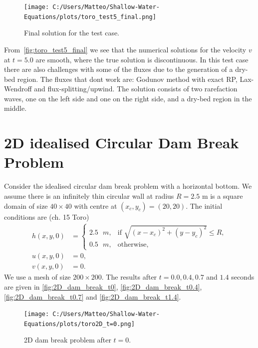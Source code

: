 \begin{figure}[H]
    \centering
    \texttt{[image: C:/Users/Matteo/Shallow-Water-Equations/plots/toro\_test5\_final.png]}
    \caption{Final solution for the test case.}\label{fig:toro_test5_final}
\end{figure}
From~\autoref{fig:toro_test5_final} we see that the numerical solutions for the velocity $v$ at $t=5.0$ are smooth, where the true solution is discontinuous. 
In this test case there are also challenges with some of the fluxes due to the generation of a dry-bed region.
The fluxes that dont work are: Godunov method with exact RP, Lax-Wendroff and flux-splitting/upwind.
The solution consists of two rarefaction waves, one on the left side and one on the right side, and a dry-bed region in the middle.

\section{2D idealised Circular Dam Break Problem}
Consider the idealised circular dam break problem with a horizontal bottom.
We assume there is an infinitely thin circular wall at radius $R = 2.5$ m is a square domain of size $40 \times 40 $ with centre at $(x_c,y_c) = (20, 20)$.
The initial conditions are (ch. 15 Toro)
\begin{align*}
    h(x,y,0) &= \begin{cases}
        2.5 \text{ }m, & \text{if } \sqrt{ {(x-x_c)}^2 + {(y-y_c)}^2 } \leq R, \\
        0.5 \text{ }m, & \text{otherwise},
    \end{cases} \\
    u(x,y,0) &= 0, \\
    v(x,y,0) &= 0.
\end{align*}
We use a mesh of size $200 \times 200$.
The results after $t=0.0, 0.4, 0.7$ and $1.4$ seconds are given in \autoref{fig:2D_dam_break_t0}, \autoref{fig:2D_dam_break_t0.4}, \autoref{fig:2D_dam_break_t0.7} and \autoref{fig:2D_dam_break_t1.4}.

\begin{figure}[H]
    \centering
    \texttt{[image: C:/Users/Matteo/Shallow-Water-Equations/plots/toro2D\_t=0.png]}
    \caption{2D dam break problem after $t=0$.}\label{fig:2D_dam_break_t0}
\end{figure}

